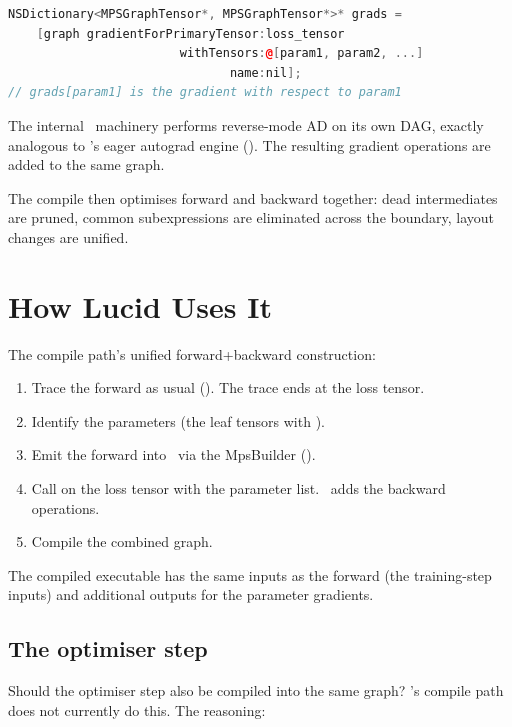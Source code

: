 \begin{lstlisting}[style=lucidcpp,language=C++]
NSDictionary<MPSGraphTensor*, MPSGraphTensor*>* grads =
    [graph gradientForPrimaryTensor:loss_tensor
                        withTensors:@[param1, param2, ...]
                               name:nil];
// grads[param1] is the gradient with respect to param1
\end{lstlisting}

The internal \MPSGraph\ machinery performs reverse-mode AD on
its own DAG, exactly analogous to \Lucid's eager autograd
engine (). The resulting gradient
operations are added to the same graph.

The compile then optimises forward and backward together: dead
intermediates are pruned, common subexpressions are eliminated
across the boundary, layout changes are unified.

\section{How Lucid Uses It}
\label{sec:fwd_bwd_compile:how_lucid_uses}

The compile path's unified forward+backward construction:

\begin{enumerate}
  \item Trace the forward as usual (). The
    trace ends at the loss tensor.
  \item Identify the parameters (the leaf tensors with
    ).
  \item Emit the forward into \MPSGraph\ via the MpsBuilder
    ().
  \item Call  on the loss tensor
    with the parameter list. \MPSGraph\ adds the backward
    operations.
  \item Compile the combined graph.
\end{enumerate}

The compiled executable has the same inputs as the forward (the
training-step inputs) and additional outputs for the parameter
gradients.

\subsection{The optimiser step}
\label{ssec:fwd_bwd_compile:optimiser_step}

Should the optimiser step also be compiled into the same graph?
\Lucid's compile path does not currently do this. The reasoning:

